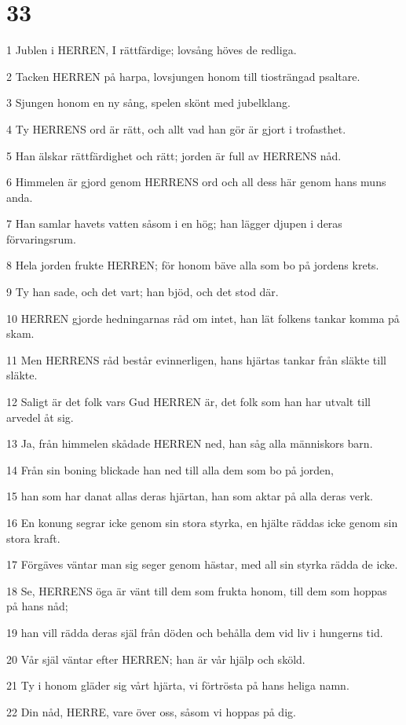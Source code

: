 \chapter{33}

\par 1 Jublen i HERREN, I rättfärdige; lovsång höves de redliga.
\par 2 Tacken HERREN på harpa, lovsjungen honom till tiosträngad psaltare.
\par 3 Sjungen honom en ny sång, spelen skönt med jubelklang.
\par 4 Ty HERRENS ord är rätt, och allt vad han gör är gjort i trofasthet.
\par 5 Han älskar rättfärdighet och rätt; jorden är full av HERRENS nåd.
\par 6 Himmelen är gjord genom HERRENS ord och all dess här genom hans muns anda.
\par 7 Han samlar havets vatten såsom i en hög; han lägger djupen i deras förvaringsrum.
\par 8 Hela jorden frukte HERREN; för honom bäve alla som bo på jordens krets.
\par 9 Ty han sade, och det vart; han bjöd, och det stod där.
\par 10 HERREN gjorde hedningarnas råd om intet, han lät folkens tankar komma på skam.
\par 11 Men HERRENS råd består evinnerligen, hans hjärtas tankar från släkte till släkte.
\par 12 Saligt är det folk vars Gud HERREN är, det folk som han har utvalt till arvedel åt sig.
\par 13 Ja, från himmelen skådade HERREN ned, han såg alla människors barn.
\par 14 Från sin boning blickade han ned till alla dem som bo på jorden,
\par 15 han som har danat allas deras hjärtan, han som aktar på alla deras verk.
\par 16 En konung segrar icke genom sin stora styrka, en hjälte räddas icke genom sin stora kraft.
\par 17 Förgäves väntar man sig seger genom hästar, med all sin styrka rädda de icke.
\par 18 Se, HERRENS öga är vänt till dem som frukta honom, till dem som hoppas på hans nåd;
\par 19 han vill rädda deras själ från döden och behålla dem vid liv i hungerns tid.
\par 20 Vår själ väntar efter HERREN; han är vår hjälp och sköld.
\par 21 Ty i honom gläder sig vårt hjärta, vi förtrösta på hans heliga namn.
\par 22 Din nåd, HERRE, vare över oss, såsom vi hoppas på dig.

